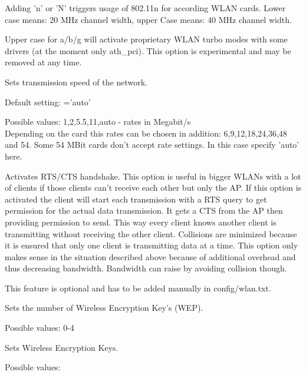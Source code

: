 \begin{description}
        Adding 'n' or 'N' triggers usage of 802.11n for according WLAN cards.
        Lower case means: 20 MHz channel width, upper Case means: 40 MHz channel width.
        
        Upper case for a/b/g will activate proprietary WLAN turbo modes with some drivers 
        (at the moment only ath\_pci). This option is experimental and may be removed at 
        any time.


        Sets transmission speed of the network.

        Default setting: ='auto'

        Possible values: 1,2,5.5,11,auto - rates in Megabit/s\\
        Depending on the card this rates can be chosen in addition: 6,9,12,18,24,36,48 and 54.
        Some 54 MBit cards don't accept rate settings. In this case specify 'auto' here.
        

        Activates RTS/CTS handshake. This option is useful in bigger WLANs with a lot of clients 
        if those clients can't receive each other but only the AP. If this option is activated 
        the client will start each transmission with a RTS query to get permission for the actual 
        data transmission. It gets a CTS from the AP then providing permission to send. This way 
        every client knows another client is transmitting without receiving the other client. 
        Collisions are minimized because it is ensured that only one client is transmitting 
        data at a time. This option only makes sense in the situation described above because of 
        additional overhead and thus decreasing bandwidth. Bandwidth can raise by avoiding 
        collision though. 
        
        This feature is optional and has to be added manually in config/wlan.txt.
        

        Sets the number of Wireless Encryption Key's (WEP).

        Possible values: 0-4


        Sets Wireless Encryption Keys.

        Possible values:


\end{description}
